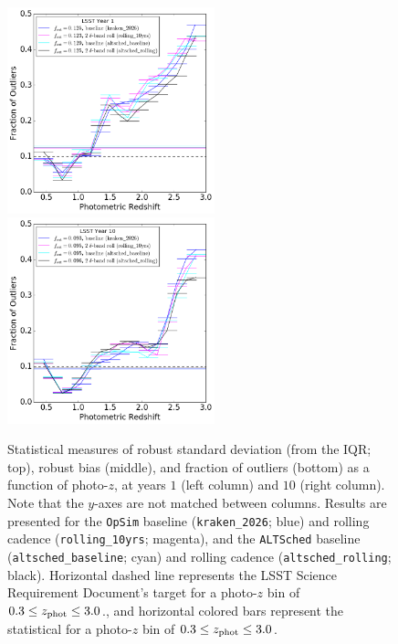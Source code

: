 \begin{figure}
\begin{center}
\includegraphics[width=6cm,trim={0cm 0cm 0cm 0cm},clip]{figures/ALTyear1_fout.png}
\includegraphics[width=6cm,trim={0cm 0cm 0cm 0cm},clip]{figures/ALTyear10_fout.png}
\caption{Statistical measures of robust standard deviation (from the IQR; top), robust bias (middle), and fraction of outliers (bottom) as a function of photo-$z$, at years $1$ (left column) and $10$ (right column). Note that the $y$-axes are not matched between columns. Results are presented for the {\tt OpSim} baseline ({\tt kraken\_2026}; blue) and rolling cadence ({\tt rolling\_10yrs}; magenta), and the {\tt ALTSched} baseline ({\tt altsched\_baseline}; cyan) and rolling cadence ({\tt altsched\_rolling}; black). Horizontal dashed line represents the LSST Science Requirement Document's target for a photo-$z$ bin of $0.3 \leq z_{\rm phot} \leq 3.0$., and horizontal colored bars represent the statistical for a photo-$z$ bin of $0.3 \leq z_{\rm phot} \leq 3.0$. \label{fig:stats_altsched}}
\end{center}
\end{figure}

